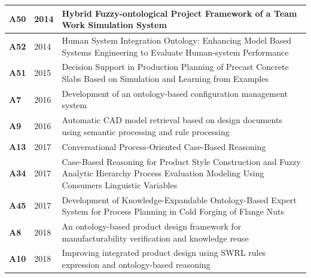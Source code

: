 {\begin{longtable}{ | m{1cm} | m{1.5cm} | m{12cm} | }
                    \hline
                    \textbf{A50} &2014 &Hybrid Fuzzy-ontological Project Framework of a Team Work Simulation System \\ %
                    \hline
                    \textbf{A52} &2014 &Human System Integration Ontology: Enhancing Model Based Systems Engineering to Evaluate Human-system Performance \\ %
                    \hline
                    \textbf{A51} &2015 &Decision Support in Production Planning of Precast Concrete Slabs Based on Simulation and Learning from Examples \\ %
                    \hline
                    \textbf{A7} &2016 &Development of an ontology-based configuration management system \\ %
                    \hline
                    \textbf{A9} &2016 &Automatic CAD model retrieval based on design documents using semantic processing and rule processing \\ %
                    \hline
                    \textbf{A13} &2017 &Conversational Process-Oriented Case-Based Reasoning \\ %
                    \hline
                    \textbf{A34} &2017 &Case-Based Reasoning for Product Style Construction and Fuzzy Analytic Hierarchy Process Evaluation Modeling Using Consumers Linguistic Variables \\ %
                    \hline
                    \textbf{A45} &2017 &Development of Knowledge-Expandable Ontology-Based Expert System for Process Planning in Cold Forging of Flange Nuts \\ %
                    \hline
                    \textbf{A8} &2018 &An ontology-based product design framework for manufacturability verification and knowledge reuse \\ %
                    \hline
                    \textbf{A10} &2018 &Improving integrated product design using SWRL rules expression and ontology-based reasoning \\ %

\end{longtable}}
